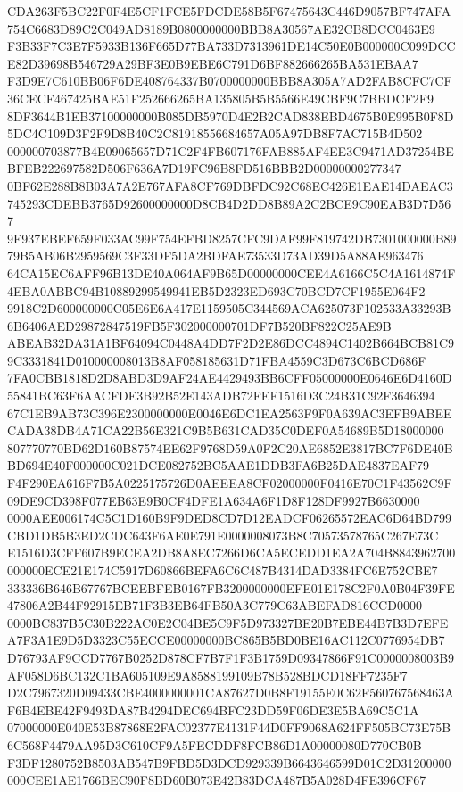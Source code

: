 \documentclass[UTF8,fontset=fandol,zihao=-4,a4paper]{ctexart}
\begin{document}
{{CDA263F5BC22F0F4E5CF1FCE5FDCDE58B5F67475643C446D9057BF747AFA754C6683D89C2C049AD8189B0800000000BBB8A30567AE32CB8DCC0463E9
F3B33F7C3E7F5933B136F665D77BA733D7313961DE14C50E0B000000C099DCCE82D39698B546729A29BF3E0B9EBE6C791D6BF882666265BA531EBAA7
F3D9E7C610BB06F6DE408764337B0700000000BBB8A305A7AD2FAB8CFC7CF36CECF467425BAE51F252666265BA135805B5B5566E49CBF9C7BBDCF2F9
8DF3644B1EB37100000000B085DB5970D4E2B2CAD838EBD4675B0E995B0F8D5DC4C109D3F2F9D8B40C2C81918556684657A05A97DB8F7AC715B4D502
000000703877B4E09065657D71C2F4FB607176FAB885AF4EE3C9471AD37254BEBFEB222697582D506F636A7D19FC96B8FD516BBB2D00000000277347
0BF62E288B8B03A7A2E767AFA8CF769DBFDC92C68EC426E1EAE14DAEAC3745293CDEBB3765D92600000000D8CB4D2DD8B89A2C2BCE9C90EAB3D7D567
9F937EBEF659F033AC99F754EFBD8257CFC9DAF99F819742DB7301000000B8979B5AB06B2959569C3F33DF5DA2BDFAE73533D73AD39D5A88AE963476
64CA15EC6AFF96B13DE40A064AF9B65D00000000CEE4A6166C5C4A1614874F4EBA0ABBC94B10889299549941EB5D2323ED693C70BCD7CF1955E064F2
9918C2D600000000C05E6E6A417E1159505C344569ACA625073F102533A33293B6B6406AED29872847519FB5F302000000701DF7B520BF822C25AE9B
ABEAB32DA31A1BF64094C0448A4DD7F2D2E86DCC4894C1402B664BCB81C99C3331841D010000008013B8AF058185631D71FBA4559C3D673C6BCD686F
7FA0CBB1818D2D8ABD3D9AF24AE4429493BB6CFF05000000E0646E6D4160D55841BC63F6AACFDE3B92B52E143ADB72FEF1516D3C24B31C92F3646394
67C1EB9AB73C396E2300000000E0046E6DC1EA2563F9F0A639AC3EFB9ABEECADA38DB4A71CA22B56E321C9B5B631CAD35C0DEF0A54689B5D18000000
807770770BD62D160B87574EE62F9768D59A0F2C20AE6852E3817BC7F6DE40BBD694E40F000000C021DCE082752BC5AAE1DDB3FA6B25DAE4837EAF79
F4F290EA616F7B5A0225175726D0AEEEA8CF02000000F0416E70C1F43562C9F09DE9CD398F077EB63E9B0CF4DFE1A634A6F1D8F128DF9927B6630000
0000AEE006174C5C1D160B9F9DED8CD7D12EADCF06265572EAC6D64BD799CBD1DB5B3ED2CDC643F6AE0E791E0000008073B8C70573578765C267E73C
E1516D3CFF607B9ECEA2DB8A8EC7266D6CA5ECEDD1EA2A704B8843962700000000ECE21E174C5917D60866BEFA6C6C487B4314DAD3384FC6E752CBE7
333336B646B67767BCEEBFEB0167FB3200000000EFE01E178C2F0A0B04F39FE47806A2B44F92915EB71F3B3EB64FB50A3C779C63ABEFAD816CCD0000
0000BC837B5C30B222AC0E2C04BE5C9F5D973327BE20B7EBE44B7B3D7EFEA7F3A1E9D5D3323C55ECCE00000000BC865B5BD0BE16AC112C0776954DB7
D76793AF9CCD7767B0252D878CF7B7F1F3B1759D09347866F91C0000008003B9AF058D6BC132C1BA605109E9A8588199109B78B528BDCD18FF7235F7
D2C7967320D09433CBE4000000001CA87627D0B8F19155E0C62F560767568463AF6B4EBE42F9493DA87B4294DEC694BFC23DD59F06DE3E5BA69C5C1A
07000000E040E53B87868E2FAC02377E4131F44D0FF9068A624FF505BC73E75B6C568F4479AA95D3C610CF9A5FECDDF8FCB86D1A00000080D770CB0B
F3DF1280752B8503AB547B9FBD5D3DCD929339B6643646599D01C2D31200000000CEE1AE1766BEC90F8BD60B073E42B83DCA487B5A028D4FE396CF67
}}
\end{document}
